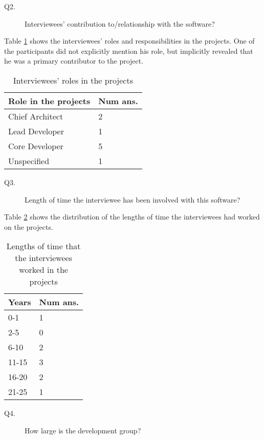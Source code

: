 \begin{description}
\item[Q2.] Interviewees’ contribution to/relationship with the software?
\end{description}

Table \ref{tab_q2_roles} shows the interviewees’ roles and responsibilities in the projects. One of the participants did not explicitly mention his role, but implicitly revealed that he was a primary contributor to the project.

\begin{table}[H]
\centering
\begin{tabular}{ll}
\hline
Role in the projects & Num ans. \\ \hline
Chief Architect & 2 \\
Lead Developer & 1 \\
Core Developer & 5 \\
Unspecified & 1 \\ \hline
\end{tabular}
\caption{\label{tab_q2_roles}Interviewees' roles in the projects}
\end{table}

\begin{description}
\item[Q3.] Length of time the interviewee has been involved with this software?
\end{description}

Table \ref{tab_q3_years} shows the distribution of the lengths of time the interviewees had worked on the projects.

\begin{table}[H]
\centering
\begin{tabular}{ll}
\hline
Years & Num ans. \\ \hline
0-1 & 1 \\
2-5 & 0 \\
6-10 & 2 \\
11-15 & 3 \\
16-20 & 2 \\
21-25 & 1 \\ \hline
\end{tabular}
\caption{\label{tab_q3_years}Lengths of time that the interviewees worked in the projects}
\end{table}

\begin{description}
\item[Q4.] How large is the development group?
\end{description}

